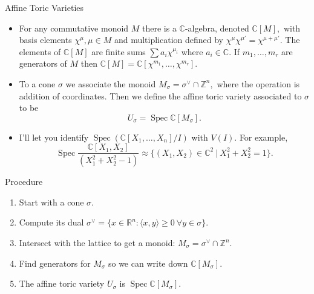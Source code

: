 \documentclass{beamer}
\newcommand{\C}{\mathbb{C}}
\DeclareMathOperator{\Spec}{Spec}
\begin{document}
\begin{frame}{Affine Toric Varieties}
\begin{itemize}
 \item For any commutative monoid $M$ there is a $\mathbb{C}$-algebra, denoted $\mathbb{C}[M],$ with basis elements $\chi^{\mu}, \mu \in M$ and multiplication defined by $\chi^{\mu} \chi^{\mu'} = \chi^{\mu + \mu'}.$ The elements of $\mathbb{C}[M]$ are finite sums $\sum a_i \chi^{\mu_i}$ where $a_i\in \mathbb{C}.$ If $m_1,\ldots, m_r$ are generators of $M$ then $\mathbb{C}[M] = \mathbb{C}[\chi^{m_1},\ldots, \chi^{m_r}].$

 \item To a cone $\sigma$ we associate the monoid $M_{\sigma} = \sigma^{\vee} \cap \mathbb{Z}^n,$ where the operation is addition of coordinates. Then we define the affine toric variety associated to $\sigma$ to be $$U_{\sigma} = \operatorname{Spec} \mathbb{C}[M_{\sigma}].$$

 \item I'll let you identify $\Spec \left(\C[X_1,\ldots, X_n]/I\right)$ with $V(I).$ For example, $$\Spec \frac{\C[X_1,X_2]}{(X_1^2+X_2^2-1)} \approx \big\{ (X_1,X_2)\in \C^2 \ | \ X_1^2+X_2^2=1\big\}.$$

\end{itemize}
\end{frame}

\begin{frame}{Procedure}
 \begin{enumerate}
  \item Start with a cone $\sigma.$
  \item Compute its dual $\sigma^{\vee} = \{ x\in \mathbb{R}^n : \langle x,y \rangle \geq 0 \ \forall y \in \sigma \}.$
  \item Intersect with the lattice to get a monoid: $M_{\sigma} = \sigma^{\vee} \cap \mathbb{Z}^n.$
  \item Find generators for $M_{\sigma}$ so we can write down $\mathbb{C}[M_{\sigma}].$
  \item The affine toric variety $U_{\sigma}$ is $\operatorname{Spec}\mathbb{C}[M_{\sigma}].$
 \end{enumerate}

\end{frame}
\end{document}
